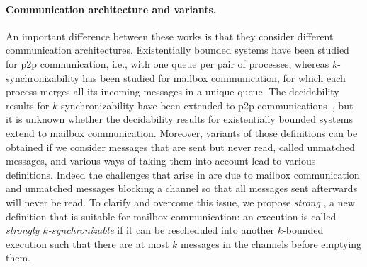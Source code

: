 \documentclass[a4paper,UKenglish,cleveref, autoref, thm-restate]{lipics-v2021}
\begin{document}
\paragraph*{Communication architecture and variants.}
An important difference between these works is that
they consider different communication architectures.
Existentially bounded systems
have been studied for p2p communication, i.e., with one queue per
pair of processes, whereas $k$-synchronizability has been studied
for mailbox communication, for which each process merges
all its incoming messages in a unique queue. The decidability
results for $k$-synchronizability have been extended to p2p
communications~\cite{DBLP:conf/fossacs/GiustoLL20}, but
it is unknown whether the decidability results for existentially
bounded systems extend to mailbox communication. Moreover,
variants of those definitions can be
obtained if we consider messages that are sent but never read,
called unmatched messages, and various ways of taking
them into account lead to various definitions.
Indeed the challenges that arise  in  \cite{DBLP:conf/cav/BouajjaniEJQ18} are due to mailbox communication and unmatched messages blocking a channel so that all messages sent afterwards will never be read.
To clarify and overcome this issue, we propose \emph{strong }, a new definition that is suitable for mailbox communication: an execution is called \emph{strongly $k$-synchronizable} if it can be rescheduled into another $k$-bounded execution such that there are at most $k$ messages in the channels before emptying them.

\end{document}
